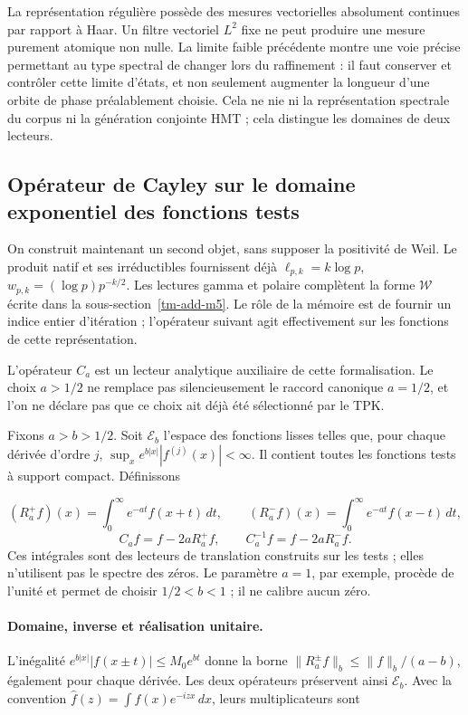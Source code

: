 La représentation régulière possède des mesures vectorielles absolument continues par rapport à Haar. Un filtre vectoriel \(L^2\) fixe ne peut produire une mesure purement atomique non nulle. La limite faible précédente montre une voie précise permettant au type spectral de changer lors du raffinement : il faut conserver et contrôler cette limite d'états, et non seulement augmenter la longueur d'une orbite de phase préalablement choisie. Cela ne nie ni la représentation spectrale du corpus ni la génération conjointe HMT ; cela distingue les domaines de deux lecteurs.


\subsection{Opérateur de Cayley sur le domaine exponentiel des fonctions tests}
\label{tm-add-m4}
On construit maintenant un second objet, sans supposer la positivité de Weil. Le produit natif et ses irréductibles fournissent déjà \(\ell_{p,k}=k\log p\), \(w_{p,k}=(\log p)p^{-k/2}\). Les lectures gamma et polaire complètent la forme \(\mathscr W\) écrite dans la sous-section~\ref{tm-add-m5}. Le rôle de la mémoire est de fournir un indice entier d'itération ; l'opérateur suivant agit effectivement sur les fonctions de cette représentation.

L'opérateur \(C_a\) est un lecteur analytique auxiliaire de cette formalisation. Le choix \(a>1/2\) ne remplace pas silencieusement le raccord canonique \(a=1/2\), et l'on ne déclare pas que ce choix ait déjà été sélectionné par le TPK.

Fixons \(a>b>1/2\). Soit \(\mathscr E_b\) l'espace des fonctions lisses telles que, pour chaque dérivée d'ordre \(j\), \(\sup_x e^{b|x|}|f^{(j)}(x)|<\infty\). Il contient toutes les fonctions tests à support compact. Définissons

\[
(R_a^+f)(x)=\int_0^\infty e^{-at}f(x+t)\,dt,
\qquad
(R_a^-f)(x)=\int_0^\infty e^{-at}f(x-t)\,dt,
\]
\[
\boxed{C_af=f-2aR_a^+f,\qquad C_a^{-1}f=f-2aR_a^-f.}
\]
Ces intégrales sont des lecteurs de translation construits sur les tests ; elles n'utilisent pas le spectre des zéros. Le paramètre \(a=1\), par exemple, procède de l'unité et permet de choisir \(1/2<b<1\) ; il ne calibre aucun zéro.

\paragraph{Domaine, inverse et réalisation unitaire.} L'inégalité \(e^{b|x|}|f(x\pm t)|\le M_0e^{bt}\) donne la borne \(\|R_a^\pm f\|_b\le\|f\|_b/(a-b)\), également pour chaque dérivée. Les deux opérateurs préservent ainsi \(\mathscr E_b\). Avec la convention \(\widehat f(z)=\int f(x)e^{-izx}\,dx\), leurs multiplicateurs sont

